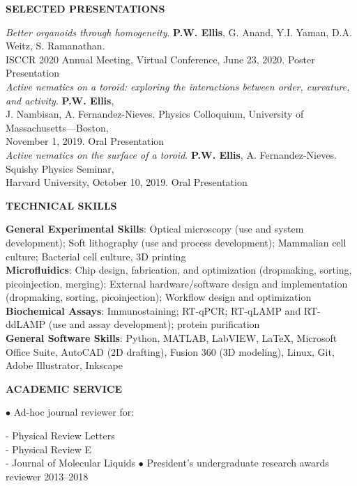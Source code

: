 \documentclass[10pt]{article}
\newenvironment{changemargin}[2]{%
  \list{}{\rightmargin#2\leftmargin#1
    \parsep=0pt\topsep=1pt\partopsep=0pt}
\item[]} {\endlist}
\newenvironment{indentmore}{\begin{changemargin}{10pt}{0cm}}{\end{changemargin}}
\begin{document}
\textbf{\large SELECTED PRESENTATIONS}
\begin{indentmore}
\emph{Better organoids through homogeneity}. \textbf{P.W. Ellis}, G. Anand, Y.I. Yaman, D.A. Weitz, S. Ramanathan. \\ \hspace*{15pt} ISCCR 2020 Annual Meeting, Virtual Conference, June 23, 2020. Poster Presentation\\

\emph{Active nematics on a toroid: exploring the interactions between order, curvature, and activity}. \textbf{P.W. Ellis}, \\ \hspace*{15pt} J. Nambisan, A. Fernandez-Nieves. Physics Colloquium, University of Massachusetts---Boston, \\ \hspace*{15pt} November 1, 2019. Oral Presentation\\

\emph{Active nematics on the surface of a toroid}. \textbf{P.W. Ellis}, A. Fernandez-Nieves. Squishy Physics Seminar, \\ \hspace*{15pt} Harvard University, October 10, 2019. Oral Presentation\\
\end{indentmore}


\textbf{\large TECHNICAL SKILLS}
\begin{indentmore}
{\bf General Experimental Skills}: Optical microscopy (use and system development); Soft lithography (use and process development); Mammalian cell culture; Bacterial cell culture, 3D printing\\
{\bf Microfluidics}: Chip design, fabrication, and optimization (dropmaking, sorting, picoinjection, merging); External hardware/software design and implementation (dropmaking, sorting, picoinjection); Workflow design and optimization\\
{\bf Biochemical Assays}: Immunostaining; RT-qPCR; RT-qLAMP and RT-ddLAMP (use and assay development); protein purification\\
{\bf General Software Skills}: Python, MATLAB, LabVIEW, \LaTeX, Microsoft Office Suite, AutoCAD (2D drafting), Fusion 360 (3D modeling), Linux, Git, Adobe Illustrator, Inkscape\\
\end{indentmore}


\textbf{\large ACADEMIC SERVICE}
\begin{indentmore}
\begin{indentmore}
$\bullet$ Ad-hoc journal reviewer for:
\begin{indentmore}
- Physical Review Letters\\
- Physical Review E\\
- Journal of Molecular Liquids
\end{indentmore}
$\bullet$ President's undergraduate research awards reviewer \hfill 2013--2018
\end{indentmore}
\end{indentmore}
\end{document}
